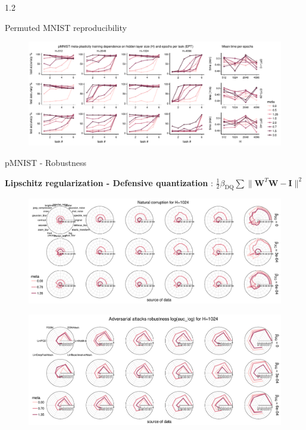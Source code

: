 \documentclass[aspectratio=32, final]{beamer}
\newlength{\colwidth}
\begin{document}
\begin{frame}[t]
\begin{columns}[t]
\begin{column}{1.2\colwidth}
\begin{block}{Permuted MNIST reproducibility}
    \begin{figure}
        \includegraphics[width=1.2\colwidth]{figures/reproduce.pdf}
    \end{figure}
  \end{block}

  \begin{block}{pMNIST - Robustness}
  
    \textbf{Lipschitz regularization - Defensive quantization} \cite{Lin2019-xs}: $\frac{1}{2}\beta_{\mathrm{DQ}}\sum \lVert \mathbf{W}^T\mathbf{W} - \mathbf{I} \rVert^2$
    
    \begin{figure}
        \centering
        \includegraphics[width=1.2\colwidth]{figures/vary-meta-dq-natcrpt-H=1024.pdf}
    \end{figure}

    \begin{figure}
        \centering
        \includegraphics[width=1.2\colwidth]{figures/vary-meta-dq-advatck-auc_log-H=1024.pdf}
    \end{figure}
    

\end{block}
\end{column}
\end{columns}
\end{frame}
\end{document}
